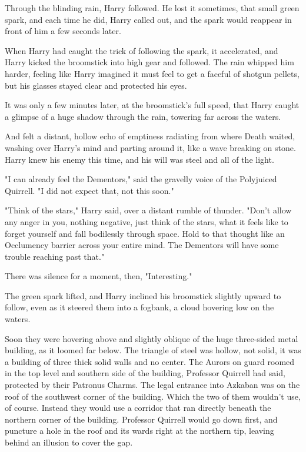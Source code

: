 Through the blinding rain, Harry followed. He lost it sometimes, that small 
green spark, and each time he did, Harry called out, and the spark would 
reappear in front of him a few seconds later.

When Harry had caught the trick of following the spark, it accelerated, and 
Harry kicked the broomstick into high gear and followed. The rain whipped him 
harder, feeling like Harry imagined it must feel to get a faceful of shotgun 
pellets, but his glasses stayed clear and protected his eyes.

It was only a few minutes later, at the broomstick's full speed, that Harry 
caught a glimpse of a huge shadow through the rain, towering far across the 
waters.

And felt a distant, hollow echo of emptiness radiating from where Death waited, 
washing over Harry's mind and parting around it, like a wave breaking on stone. 
Harry knew his enemy this time, and his will was steel and all of the light.

"I can already feel the Dementors," said the gravelly voice of the Polyjuiced 
Quirrell. "I did not expect that, not this soon."

"Think of the stars," Harry said, over a distant rumble of thunder. "Don't 
allow any anger in you, nothing negative, just think of the stars, what it 
feels like to forget yourself and fall bodilessly through space. Hold to that 
thought like an Occlumency barrier across your entire mind. The Dementors will 
have some trouble reaching past that."

There was silence for a moment, then, "Interesting."

The green spark lifted, and Harry inclined his broomstick slightly upward to 
follow, even as it steered them into a fogbank, a cloud hovering low on the 
waters.

Soon they were hovering above and slightly oblique of the huge three-sided 
metal building, as it loomed far below. The triangle of steel was hollow, not 
solid, it was a building of three thick solid walls and no center. The Aurors 
on guard roomed in the top level and southern side of the building, Professor 
Quirrell had said, protected by their Patronus Charms. The legal entrance into 
Azkaban was on the roof of the southwest corner of the building. Which the two 
of them wouldn't use, of course. Instead they would use a corridor that ran 
directly beneath the northern corner of the building. Professor Quirrell would 
go down first, and puncture a hole in the roof and its wards right at the 
northern tip, leaving behind an illusion to cover the gap.

